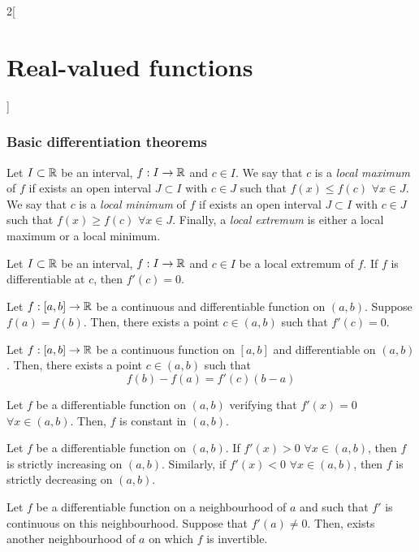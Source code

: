 \documentclass[../../../main_math.tex]{subfiles}
\begin{document}
\begin{multicols}{2}[\section{Real-valued functions}]
  \subsubsection{Basic differentiation theorems}
  \begin{definition}
    Let $I\subset\mathbb{R}$ be an interval, $f:I\rightarrow\mathbb{R}$ and $c\in I$. We say that $c$ is a \emph{local maximum} of $f$ if exists an open interval $J\subset I$ with $c\in J$ such that $f(x)\leq f(c)$ $\forall x\in J$. We say that $c$ is a \emph{local minimum} of $f$ if exists an open interval $J\subset I$ with $c\in J$ such that $f(x)\geq f(c)$ $\forall x\in J$. Finally, a \emph{local extremum} is either a local maximum or a local minimum.
  \end{definition}
  \begin{proposition}
    Let $I\subset\mathbb{R}$ be an interval, $f:I\rightarrow\mathbb{R}$ and $c\in I$ be a local extremum of $f$. If $f$ is differentiable at $c$, then $f'(c)=0$.
  \end{proposition}
  \begin{theorem}
    Let $f:[a,b]\rightarrow\mathbb{R}$ be a continuous and differentiable function on $(a,b)$. Suppose $f(a)=f(b)$. Then, there exists a point $c\in (a,b)$ such that $f'(c)=0$.
  \end{theorem}
  \begin{theorem}
    Let $f:[a,b]\rightarrow\mathbb{R}$ be a continuous function on $[a,b]$ and differentiable on $(a,b)$. Then, there exists a point $c\in (a,b)$ such that $$f(b)-f(a)=f'(c)(b-a)$$
  \end{theorem}
  \begin{corollary}
    Let $f$ be a differentiable function on $(a,b)$ verifying that $f'(x)=0$ $\forall x\in(a,b)$. Then, $f$ is constant in $(a,b)$.
  \end{corollary}
  \begin{corollary}
    Let $f$ be a differentiable function on $(a,b)$. If $f'(x)>0$ $\forall x\in(a,b)$, then $f$ is strictly increasing on $(a,b)$. Similarly, if $f'(x)<0$ $\forall x\in(a,b)$, then $f$ is strictly decreasing on $(a,b)$.
  \end{corollary}
  \begin{corollary}
    Let $f$ be a differentiable function on a neighbourhood of $a$ and such that $f'$ is continuous on this neighbourhood. Suppose that $f'(a)\ne0$. Then, exists another neighbourhood of $a$ on which $f$ is invertible.
  \end{corollary}
  \begin{theorem}

\end{theorem}
\end{multicols}
\end{document}
